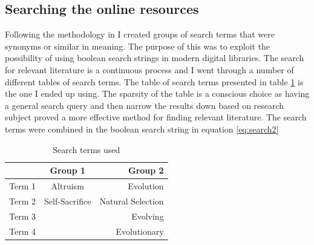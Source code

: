 \documentclass[a4paper]{book}
\begin{document}
\subsection{Searching the online resources }
Following the methodology in \cite{oates_researching_2005} I created groups of search terms that were synonyms or similar in meaning. The purpose of this was to exploit the possibility of using boolean search strings in modern digital libraries. 
The search for relevant literature is a continuous process and I went through a number of different tables of search terms. 
The table of search terms presented in table \ref{table:terms2} is the one I ended up using. The sparsity of the table is a conscious choice as having a general search query and then narrow the results down based on research subject proved a more effective method for finding relevant literature.
The search terms were combined in the boolean search string in equation \ref{eq:search2}
			\begin{table}[htdp]
			\begin{center}
			\begin{tabular}{| l | c | r |}
			\hline
			& Group 1 & Group 2 \\ \hline
			Term 1 & Altruism 	& Evolution  \\ \hline
			Term 2 & Self-Sacrifice	& Natural Selection \\ \hline
			Term 3 & 		& Evolving   \\ \hline
			Term 4 & 		& Evolutionary  \\ \hline\hline
			\end{tabular}
			\end{center}
			\label{table:terms2}
			\caption{Search terms used}
			\end{table}
\end{document}
